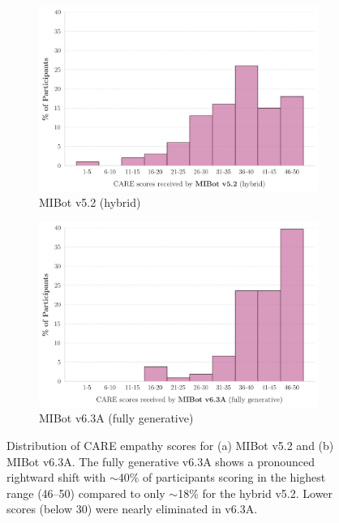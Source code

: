 \begin{figure}[htbp]
    \centering
    \begin{subfigure}[b]{0.48\textwidth}
        \centering
        \includegraphics[width=\textwidth]{fig/MIV5.2_care_scores_histogram.png}
        \caption{MIBot v5.2 (hybrid)}
        \label{fig:care_v5.2}
    \end{subfigure}
    \hfill
    \begin{subfigure}[b]{0.48\textwidth}
        \centering
        \includegraphics[width=\textwidth]{fig/2024-11-14-MIV6.3A-2024-11-22-MIV6.3A_care_scores_histogram.png}
        \caption{MIBot v6.3A (fully generative)}
        \label{fig:care_v6.3}
    \end{subfigure}
    \caption{Distribution of CARE empathy scores for (a) MIBot v5.2 and (b) MIBot v6.3A. The fully generative v6.3A shows a pronounced rightward shift with $\sim$40\% of participants scoring in the highest range (46--50) compared to only $\sim$18\% for the hybrid v5.2. Lower scores (below 30) were nearly eliminated in v6.3A.}
    \label{fig:care_distributions}
\end{figure}

